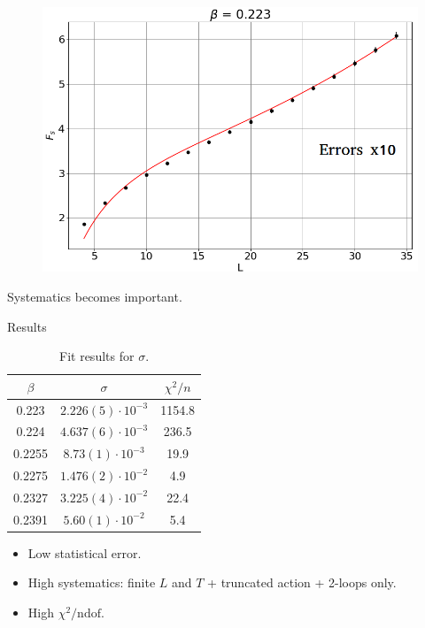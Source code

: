 \documentclass[12pt,handout]{beamer}
\begin{document}
\begin{frame}
\begin{center}
\begin{figure}[!htb]
\centering
\includegraphics[scale=0.4, center]{0223.png}
\end{figure}
Systematics becomes important.
\end{center}
\end{frame}

\begin{frame}{Results}
\begin{center}
\begin{table}[!htb]
\centering
\begin{tabular}{|c|c|c|}
\hline
$\beta$ & $\sigma$ & $\chi ^2 /n$ \\
\hline
0.223 &  $2.226(5) \cdot 10^{-3}$ & 1154.8\\
\hline
0.224 & $4.637(6) \cdot 10^{-3} $ & 236.5\\
\hline
0.2255 & $8.73(1)\cdot 10^{-3}$ & 19.9\\
\hline
0.2275 & $1.476(2)\cdot 10^{-2}$ & 4.9\\
\hline
0.2327 & $3.225(4)\cdot 10 ^{-2}$ & 22.4\\
\hline
0.2391 & $5.60(1)\cdot 10^{-2}$ & 5.4\\
\hline
\end{tabular}
\caption{Fit results for $\sigma$.\label{tab:fitsigma}}
\end{table}
\begin{itemize}
\item Low statistical error.
\item High systematics: finite $L$ and $T$ + truncated action + 2-loops only.
\item High $\chi ^2/\mbox{ndof}$.
\end{itemize}
\end{center}
\end{frame}
\end{document}
